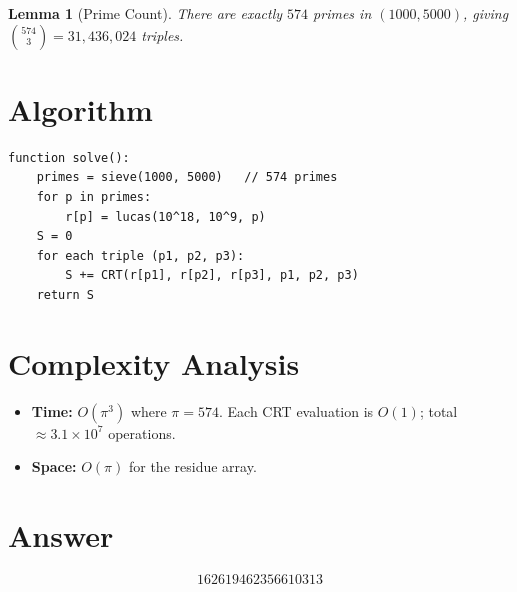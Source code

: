 \documentclass[11pt]{article}
\newtheorem{lemma}[theorem]{Lemma}
\begin{document}
\begin{lemma}[Prime Count]
There are exactly $574$ primes in $(1000, 5000)$, giving $\binom{574}{3} = 31{,}436{,}024$ triples.
\end{lemma}

\section{Algorithm}

\begin{verbatim}
function solve():
    primes = sieve(1000, 5000)   // 574 primes
    for p in primes:
        r[p] = lucas(10^18, 10^9, p)
    S = 0
    for each triple (p1, p2, p3):
        S += CRT(r[p1], r[p2], r[p3], p1, p2, p3)
    return S
\end{verbatim}

\section{Complexity Analysis}

\begin{itemize}
\item \textbf{Time:} $O(\pi^3)$ where $\pi = 574$. Each CRT evaluation is $O(1)$; total $\approx 3.1 \times 10^7$ operations.
\item \textbf{Space:} $O(\pi)$ for the residue array.
\end{itemize}

\section{Answer}

\[
\boxed{162619462356610313}
\]
\end{document}

